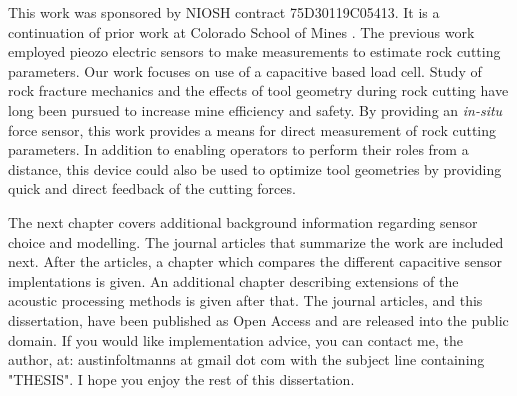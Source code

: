 This work was sponsored by NIOSH contract 75D30119C05413.
It is a continuation of prior work at Colorado School of Mines \cite{11124/170545}.
The previous work employed pieozo electric sensors to make measurements to estimate
rock cutting parameters. 
Our work focuses on use of a capacitive based load cell.
Study of rock fracture mechanics \cite{11124/14359} 
and the effects of tool geometry during rock cutting \cite{11124/13192, 11124/16423, 11124/176345} 
have long been pursued to increase mine efficiency and safety.
By providing an \textit{in-situ} force sensor, this work provides a means
for direct measurement of rock cutting parameters.
In addition to enabling operators to perform their roles from a distance,
this device could also be used to optimize tool geometries 
by providing quick and direct feedback of the cutting forces.

The next chapter covers additional background information regarding sensor choice and modelling.
The journal articles that summarize the work are included next.
After the articles, a chapter which compares the different capacitive sensor implentations is given.
An additional chapter describing extensions of the acoustic processing methods is given after that.
The journal articles, and this dissertation, have been published as Open Access 
and are released into the public domain.
If you would like implementation advice, you can contact me, the author, at:
austinfoltmanns at gmail dot com with the subject line containing "THESIS".
I hope you enjoy the rest of this dissertation.

